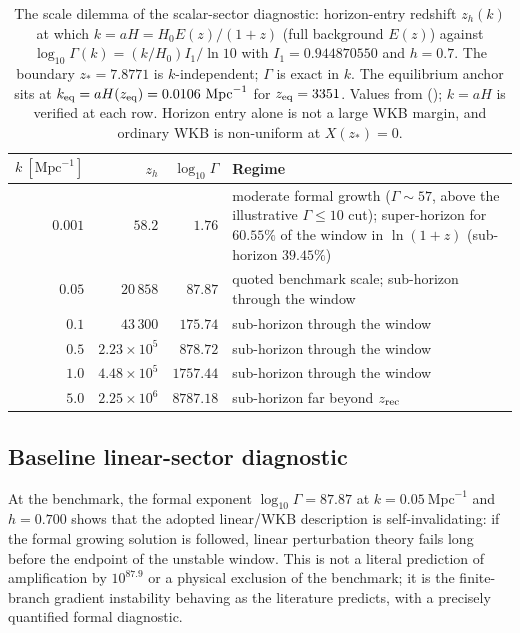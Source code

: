 \begin{table}[t]
\centering\small
\caption{The scale dilemma of the scalar-sector diagnostic: horizon-entry redshift $z_h(k)$ at which $k=aH=H_0E(z)/(1+z)$ (full background $E(z)$) against $\log_{10}\Gamma(k)=(k/H_0)I_1/\ln10$ with $I_1=0.944870550$ and $h=0.7$. The boundary $z_*=7.8771$ is $k$-independent; $\Gamma$ is exact in $k$. The equilibrium anchor sits at $k_{\rm eq}=aH(z_{\rm eq})=0.0106\ \mathrm{Mpc}^{-1}$ for $z_{\rm eq}=3351$. Values from  (); $k=aH$ is verified at each row. Horizon entry alone is not a large WKB margin, and ordinary WKB is non-uniform at $X(z_*)=0$.}\label{tab:dilemma}
\begin{tabularx}{\textwidth}{@{}rrrX@{}}
\toprule
$k\ [\mathrm{Mpc}^{-1}]$ & $z_h$ & $\log_{10}\Gamma$ & Regime\\
\midrule
$0.001$ & $58.2$ & $1.76$ & moderate formal growth ($\Gamma\sim57$, above the illustrative $\Gamma\le10$ cut); super-horizon for $60.55\%$ of the window in $\ln(1+z)$ (sub-horizon $39.45\%$)\\
$0.05$ & $20\,858$ & $87.87$ & quoted benchmark scale; sub-horizon through the window\\
$0.1$ & $43\,300$ & $175.74$ & sub-horizon through the window\\
$0.5$ & $2.23\times10^{5}$ & $878.72$ & sub-horizon through the window\\
$1.0$ & $4.48\times10^{5}$ & $1757.44$ & sub-horizon through the window\\
$5.0$ & $2.25\times10^{6}$ & $8787.18$ & sub-horizon far beyond $z_{\rm rec}$\\
\bottomrule
\end{tabularx}
\end{table}

\subsection{Baseline linear-sector diagnostic}
At the benchmark, the formal exponent $\log_{10}\Gamma=87.87$ at $k=0.05\ \mathrm{Mpc}^{-1}$ and $h=0.700$ shows that the adopted linear/WKB description is self-invalidating: if the formal growing solution is followed, linear perturbation theory fails long before the endpoint of the unstable window. This is not a literal prediction of amplification by $10^{87.9}$ or a physical exclusion of the benchmark; it is the finite-branch gradient instability behaving as the literature predicts, with a precisely quantified formal diagnostic.

